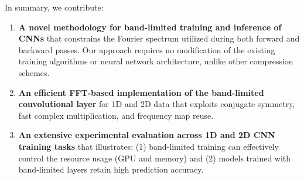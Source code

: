 In summary, we contribute:
\begin{enumerate}[noitemsep]
\item 
\textbf{A novel methodology for band-limited training and inference of CNNs} 
that constrains the Fourier spectrum utilized during both forward and backward passes. Our approach requires no modification of the  existing training algorithms or neural network architecture, unlike other compression schemes.
\item 
\textbf{An efficient FFT-based implementation of the band-limited convolutional layer} for 1D and 2D data that exploits conjugate symmetry, fast complex multiplication, and frequency map reuse. 
\item 
\textbf{An extensive experimental evaluation across 1D and 2D CNN training tasks} that illustrates: (1) band-limited training can effectively control the resource usage (GPU and memory) and (2) models trained with band-limited layers retain high prediction accuracy.
\end{enumerate}



